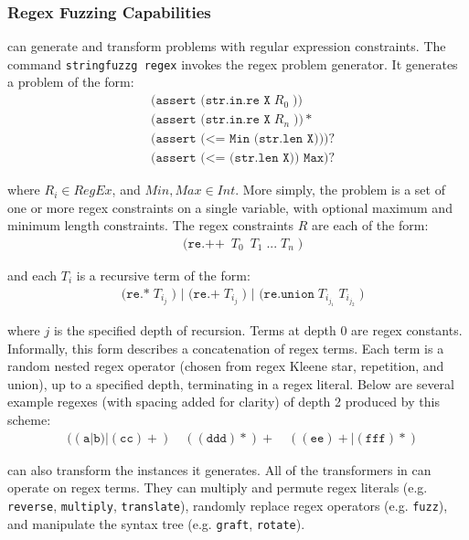 \subsubsection{Regex Fuzzing Capabilities}

\fuzzer{} can generate
and transform problems with regular expression constraints. The
command \texttt{stringfuzzg regex} invokes the regex problem
generator. It generates a problem of the form:
\begin{align*}
    & \texttt{(assert (str.in.re X}\; R_0\; \texttt{))} \\
    & \texttt{(assert (str.in.re X}\; R_n\; \texttt{))}* \\
    & \texttt{(assert (<= Min (str.len X)))}? \\
    & \texttt{(assert (<= (str.len X)) Max)}?
\end{align*}

where $R_i \in RegEx$, and $Min, Max \in Int$. More simply, the
problem is a set of one or more regex constraints on a single
variable, with optional maximum and minimum length constraints. The
regex constraints $R$ are each of the form:
\begin{align*}
  & \texttt{(re.++}\; \ T_0\; \ T_1\; \texttt{...}\; T_n\; \texttt{)}
\end{align*}

and each $T_i$ is a recursive term of the form:
\begin{align*}
  & \texttt{(re.*}\; T_{i_j}\; \texttt{) | (re.+}\; T_{i_j}\;
  \texttt{) | (re.union}\; T_{i_{j_1}}\; T_{i_{j_2}}\; \texttt{)}
\end{align*}

where $j$ is the specified depth of recursion. Terms at depth 0 are
regex constants. Informally, this form describes a concatenation of
regex terms. Each term is a random nested regex operator (chosen from
regex Kleene star, repetition, and union), up to a specified depth,
terminating in a regex literal. Below are several example regexes
(with spacing added for clarity) of depth 2 produced by this scheme:
\begin{align*}
  & ((\texttt{a}|\texttt{b})|(\texttt{cc})+)\quad
  ((\texttt{ddd})*)+\quad ((\texttt{ee})+|(\texttt{fff})*)
\end{align*}

\fuzzer{} can also transform the instances it generates. All of the
transformers in \transformer{} can operate on regex terms. They can
multiply and permute regex literals (e.g. \texttt{reverse},
\texttt{multiply}, \texttt{translate}), randomly replace regex
operators (e.g. \texttt{fuzz}), and manipulate the syntax tree
(e.g. \texttt{graft}, \texttt{rotate}).

